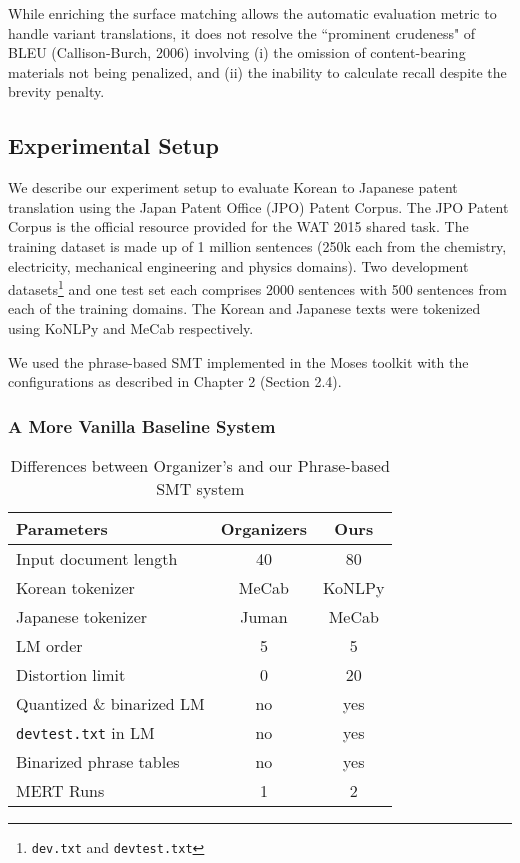 While enriching the surface \ngram{} matching allows the automatic evaluation metric to handle variant translations, it does not resolve the ``prominent crudeness" of BLEU (Callison-Burch, 2006) involving (i) the omission of content-bearing materials not being penalized, and (ii)  the inability to calculate recall despite the brevity penalty.

\subsection{Experimental Setup}

We describe our experiment setup to evaluate Korean to Japanese patent translation using the Japan Patent Office (JPO) Patent Corpus. The JPO Patent Corpus is the official resource provided for the WAT 2015 shared task. The training dataset is made up of 1 million sentences (250k each from the chemistry, electricity, mechanical engineering and physics domains). Two development datasets\footnote{{\tt dev.txt} and {\tt devtest.txt}} and one test set each comprises 2000 sentences with 500 sentences from each of the training domains. The Korean and Japanese texts were tokenized using KoNLPy \citep{park2014konlpy} and MeCab \citep{kudo2004applying} respectively.

We used the phrase-based SMT implemented in the Moses toolkit \cite{koehn2003statistical,koehn2007moses} with the configurations as described in Chapter 2 (Section 2.4).

\subsubsection{A More Vanilla Baseline System}

\begin{table*}[!ht]
\center
    \begin{tabular}{lcc}
    \textbf{Parameters}                   & \textbf{Organizers} & \textbf{Ours}   \\ \hline
    Input document length                  & 40         & 80     \\
    Korean tokenizer                       & MeCab      & KoNLPy  \\
    Japanese tokenizer                     & Juman      & MeCab \\ \hline
	LM \ngram{} order                      & 5          & 5      \\
    Distortion limit                      & 0          & 20      \\
	Quantized \& binarized LM             & no         & yes    \\
    {\tt devtest.txt} in LM                & no         & yes    \\
    Binarized phrase tables                & no         & yes    \\
    MERT Runs               & 1         & 2    \\
    \end{tabular}
\caption{Differences between Organizer's and our Phrase-based SMT system}
\label{table-diff-between-basline-and-ours}
\end{table*}

